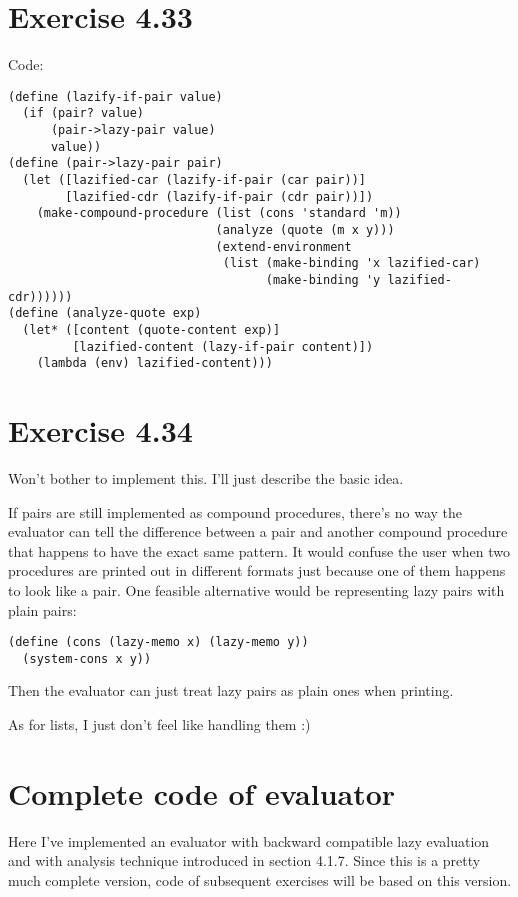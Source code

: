 \documentclass[../main.tex]{subfiles}
\begin{document}
\section{Exercise 4.33}

Code:

\begin{lstlisting}
(define (lazify-if-pair value)
  (if (pair? value)
      (pair->lazy-pair value)
      value))
(define (pair->lazy-pair pair)
  (let ([lazified-car (lazify-if-pair (car pair))]
        [lazified-cdr (lazify-if-pair (cdr pair))])
    (make-compound-procedure (list (cons 'standard 'm))
                             (analyze (quote (m x y)))
                             (extend-environment
                              (list (make-binding 'x lazified-car)
                                    (make-binding 'y lazified-cdr))))))
(define (analyze-quote exp)
  (let* ([content (quote-content exp)]
         [lazified-content (lazy-if-pair content)])
    (lambda (env) lazified-content)))
\end{lstlisting}

\section{Exercise 4.34}

Won't bother to implement this. I'll just describe the basic idea.

If pairs are still implemented as compound procedures, there's no way the evaluator can tell the difference between a pair and another compound procedure that happens to have the exact same pattern. It would confuse the user when two procedures are printed out in different formats just because one of them happens to look like a pair. One feasible alternative would be representing lazy pairs with plain pairs:

\begin{lstlisting}
(define (cons (lazy-memo x) (lazy-memo y))
  (system-cons x y))
\end{lstlisting}

Then the evaluator can just treat lazy pairs as plain ones when printing.

As for lists, I just don't feel like handling them :)

\section*{Complete code of evaluator}

Here I've implemented an evaluator with backward compatible lazy evaluation and with analysis technique introduced in section 4.1.7. Since this is a pretty much complete version, code of subsequent exercises will be based on this version.
\end{document}
